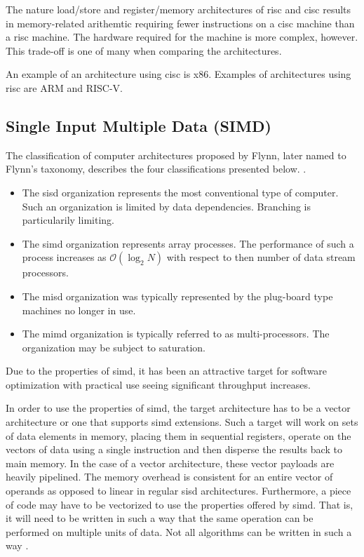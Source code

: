 The nature load/store and register/memory architectures of \gls{risc} and \gls{cisc} results in memory-related arithemtic requiring fewer instructions on a \gls{cisc} machine than a \gls{risc} machine. The hardware required for the machine is more complex, however. This trade-off is one of many when comparing the architectures\cite{carter2002}.

An example of an architecture using \gls{cisc} is \gls{x86}. Examples of architectures using \gls{risc} are ARM and RISC-V.

\subsection{Single Input Multiple Data (SIMD)}

The classification of computer architectures proposed by Flynn, later named to Flynn's taxonomy, describes the four classifications presented below. \cite{flynn1972}.

\begin{itemize}
    \item The \gls{sisd} organization represents the most conventional type of computer. Such an organization is limited by data dependencies. Branching is particularily limiting.
    \item The \gls{simd} organization represents array processes. The performance of such a process increases as $\mathcal{O}(\log_2 N)$ with respect to then number of data stream processors. 
    \item The \gls{misd} organization was typically represented by the plug-board type machines no longer in use.
    \item The \gls{mimd} organization is typically referred to as multi-processors. The organization may be subject to saturation.
\end{itemize}

Due to the properties of \gls{simd}, it has been an attractive target for software optimization with practical use seeing significant throughput increases\cite{dickson2011}.

In order to use the properties of \gls{simd}, the target architecture has to be a vector architecture or one that supports \gls{simd} extensions. Such a target will work on sets of data elements in memory, placing them in sequential registers, operate on the vectors of data using a single instruction and then disperse the results back to main memory. In the case of a vector architecture, these vector payloads are heavily pipelined. The memory overhead is consistent for an entire vector of operands as opposed to linear in regular \gls{sisd} architectures\cite{hennessy2011:vectorization}. Furthermore, a piece of code may have to be vectorized to use the properties offered by \gls{simd}. That is, it will need to be written in such a way that the same operation can be performed on multiple units of data. Not all algorithms can be written in such a way \cite{dickson2011}.

